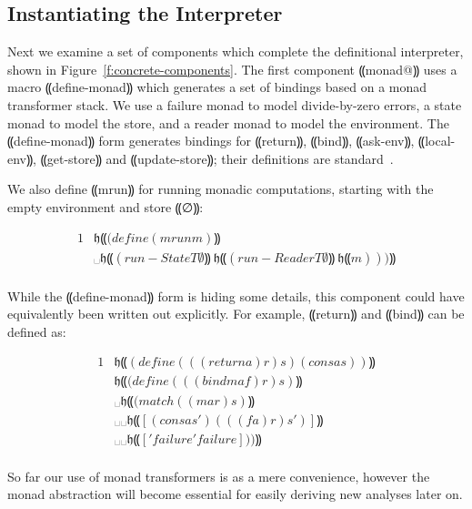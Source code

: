 \subsection{Instantiating the Interpreter}

Next we examine a set of components which complete the definitional
interpreter, shown in Figure~\ref{f:concrete-components}. The first component
⸨monad@⸩ uses a macro ⸨define-monad⸩ which generates a set of bindings based on
a monad transformer stack.  We use a failure monad to model divide-by-zero
errors, a state monad to model the store, and a reader monad to model the
environment.  The ⸨define-monad⸩ form generates bindings for ⸨return⸩, ⸨bind⸩,
⸨ask-env⸩, ⸨local-env⸩, ⸨get-store⸩ and ⸨update-store⸩; their definitions are
standard~\cite{dvanhorn:Liang1995Monad}. 

We also define ⸨mrun⸩ for running monadic computations, starting with the empty
environment and store ⸨∅⸩:

\begin{minipage}{0.4\textwidth}
\begin{alignat*}{1}
  & 𝔥⸨(define (mrun m)⸩\\
  & ␣𝔥⸨(run-StateT ∅⸩\ 𝔥⸨(run-ReaderT ∅⸩\ 𝔥⸨m)))⸩\\
\end{alignat*}
\end{minipage}

\noindent
While the ⸨define-monad⸩ form is hiding some details, this component could have
equivalently been written out explicitly. For example, ⸨return⸩ and ⸨bind⸩ can
be defined as:

\begin{minipage}{0.4\textwidth}
\begin{alignat*}{1}
& 𝔥⸨(define (((return a) r) s) (cons a s))⸩ \\
& 𝔥⸨(define (((bind ma f) r) s)⸩ \\
  &␣𝔥⸨(match ((ma r) s)⸩ \\
    &␣␣𝔥⸨[(cons a s′) (((f a) r) s′)]⸩ \\
    &␣␣𝔥⸨['failure 'failure]))⸩\\
\end{alignat*}
\end{minipage}

\noindent
So far our use of monad transformers is as a mere convenience, however the
monad abstraction will become essential for easily deriving new analyses later
on.


